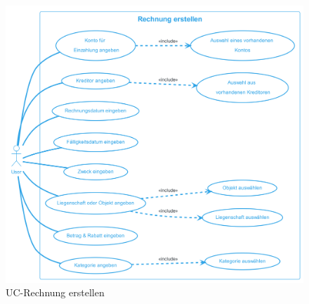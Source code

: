 \begin{figure}[H]
  \begin{center}
    \includegraphics[width=0.85\linewidth]{content/diagrams/out/usecase/rechnungErstellen/Rechnung erstellen.png}
    \caption{UC-Rechnung erstellen}
    \label{RechnungErstellen}
  \end{center}
\end{figure}
\vspace*{-1.2cm}
